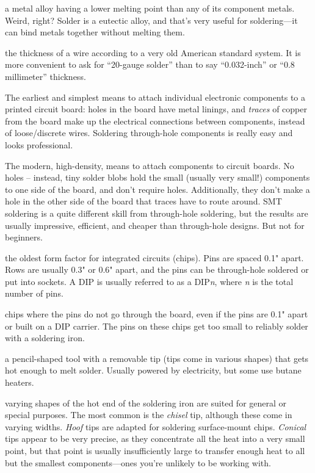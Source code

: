\documentclass[12pt]{article}
\begin{document}
\begin{description}
\+[Eutectic:] a metal alloy having a lower melting point than any of its component metals. Weird, right? Solder is a eutectic alloy, and that's very useful for soldering---it can bind metals together without melting them.

\+[Gauge:] the thickness of a wire according to a very old American standard system. It is more convenient to ask for ``20-gauge solder'' than to say ``0.032-inch'' or ``0.8 millimeter'' thickness.

 The earliest and simplest means to attach individual electronic components to a printed circuit board: holes in the board have metal linings, and \emph{traces} of copper from the board make up the electrical connections between components, instead of loose/discrete wires. Soldering through-hole components is really easy and looks professional.

 The modern, high-density, means to attach components to circuit boards. No holes -- instead, tiny solder blobs hold the small (usually very small!) components to one side of the board, and don't require holes. Additionally, they don't make a hole in the other side of the board that traces have to route around. SMT soldering is a quite different skill from through-hole soldering, but the results are usually impressive, efficient, and cheaper than through-hole designs. But not for beginners.

 the oldest form factor for integrated circuits (chips). Pins are spaced 0.1" apart. Rows are usually 0.3" or 0.6" apart, and the pins can be through-hole soldered or put into sockets. A DIP is usually referred to as a DIP\emph{n}, where \emph{n} is the total number of pins. 

 chips where the pins do not go through the board, even if the pins are 0.1" apart or built on a DIP carrier. The pins on these chips get too small to reliably solder with a soldering iron.

 a pencil-shaped tool with a removable tip (tips come in various shapes) that gets hot enough to melt solder. Usually powered by electricity, but some use butane heaters.

 varying shapes of the hot end of the soldering iron are suited for general or special purposes. The most common is the \emph{chisel} tip, although these come in varying widths. \emph{Hoof} tips are adapted for soldering surface-mount chips. \emph{Conical} tips appear to be very precise, as they concentrate all the heat into a very small point, but that point is usually insufficiently large to transfer enough heat to all but the smallest components---ones you're unlikely to be working with.


\end{description}
\end{document}
